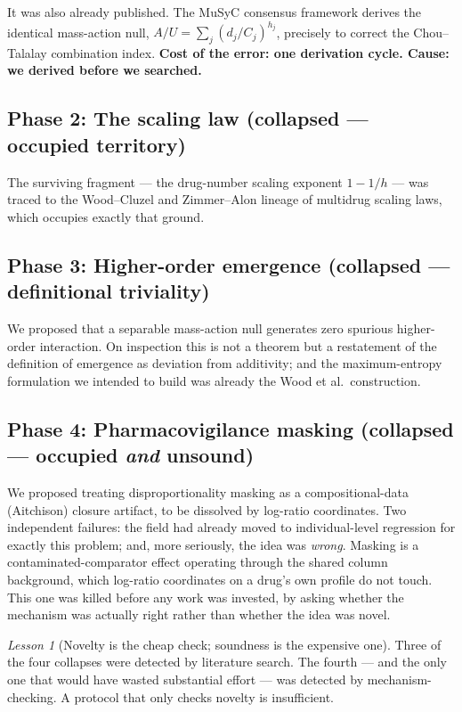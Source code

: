 \documentclass[11pt]{article}
\theoremstyle{remark}
\newtheorem{lesson}{Lesson}
\begin{document}
It was also already published. The MuSyC consensus framework \citep{wooten2021} derives the identical mass-action null, $A/U=\sum_j (d_j/C_j)^{h_j}$, precisely to correct the Chou--Talalay combination index. \textbf{Cost of the error: one derivation cycle. Cause: we derived before we searched.}

\subsection{Phase 2: The scaling law (collapsed --- occupied territory)}
The surviving fragment --- the drug-number scaling exponent $1-1/h$ --- was traced to the Wood--Cluzel and Zimmer--Alon lineage of multidrug scaling laws, which occupies exactly that ground.

\subsection{Phase 3: Higher-order emergence (collapsed --- definitional triviality)}
We proposed that a separable mass-action null generates zero spurious higher-order interaction. On inspection this is not a theorem but a restatement of the definition of emergence as deviation from additivity; and the maximum-entropy formulation we intended to build was already the Wood et al.\ construction.

\subsection{Phase 4: Pharmacovigilance masking (collapsed --- occupied \emph{and} unsound)}
We proposed treating disproportionality masking as a compositional-data (Aitchison) closure artifact, to be dissolved by log-ratio coordinates. Two independent failures: the field had already moved to individual-level regression for exactly this problem; and, more seriously, the idea was \emph{wrong}. Masking is a contaminated-comparator effect operating through the shared column background, which log-ratio coordinates on a drug's own profile do not touch. This one was killed before any work was invested, by asking whether the mechanism was actually right rather than whether the idea was novel.

\begin{lesson}[Novelty is the cheap check; soundness is the expensive one]
Three of the four collapses were detected by literature search. The fourth --- and the only one that would have wasted substantial effort --- was detected by mechanism-checking. A protocol that only checks novelty is insufficient.
\end{lesson}
\end{document}

